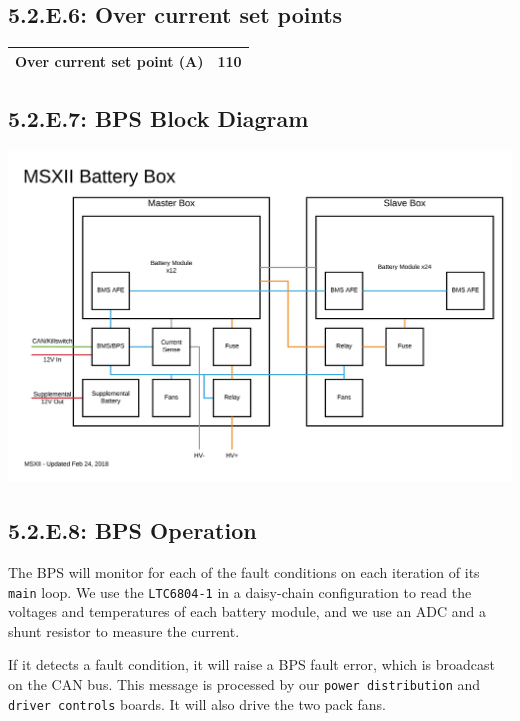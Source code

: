 \documentclass[10pt]{article}
\begin{document}
\subsection{5.2.E.6: Over current set points}

\begin{table}[!htbp]
\begin{tabular}{|l|l|}
\hline
\textbf{Over current set point (A)}    & 110 \\ \hline
\end{tabular}
\end{table}

\subsection{5.2.E.7: BPS Block Diagram}

\includegraphics[width=1\textwidth]{./figures/msxii-electrical-battery-box-block-diagram.png}

\subsection{5.2.E.8: BPS Operation}

The BPS will monitor for each of the fault conditions on each iteration of its
\texttt{main} loop. We use the \texttt{LTC6804-1} in a daisy-chain
configuration to read the voltages and temperatures of each battery module, and
we use an ADC and a shunt resistor to measure the current.

If it detects a fault condition, it will raise a BPS fault error, which is
broadcast on the CAN bus. This message is processed by our
\texttt{power distribution} and \texttt{driver controls} boards. It will also
drive the two pack fans.
\end{document}
